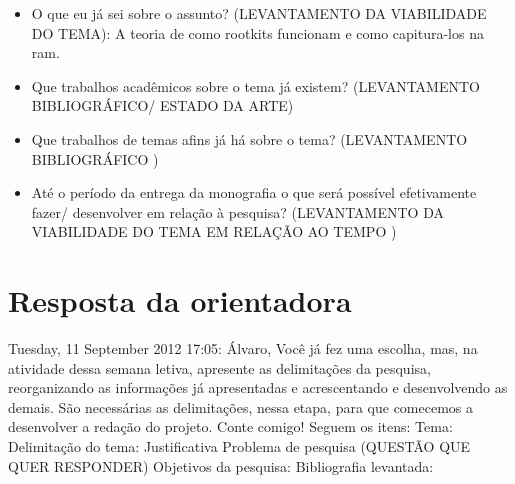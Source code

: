 \begin{itemize}
	\item O que eu já sei sobre o assunto? (LEVANTAMENTO DA VIABILIDADE DO TEMA): A teoria de como rootkits funcionam e como capitura-los na ram.


	\item Que trabalhos acadêmicos  sobre o tema já existem? (LEVANTAMENTO BIBLIOGRÁFICO/ ESTADO DA ARTE)

	\item Que trabalhos de temas afins já há sobre o tema? (LEVANTAMENTO BIBLIOGRÁFICO )

	\item Até o período da entrega da monografia o que será possível efetivamente fazer/ desenvolver em relação à pesquisa? (LEVANTAMENTO DA VIABILIDADE DO TEMA EM RELAÇÃO AO TEMPO )

\end{itemize}

\section{Resposta da orientadora}
Tuesday, 11 September 2012
17:05: Álvaro,
Você já fez uma escolha, mas, na atividade dessa semana letiva, apresente as delimitações da pesquisa, reorganizando as informações já apresentadas e acrescentando e desenvolvendo as demais. São necessárias as delimitações, nessa etapa, para que comecemos a desenvolver a redação do projeto. Conte comigo! Seguem os itens:
Tema:
Delimitação do tema:
Justificativa
Problema de pesquisa (QUESTÃO QUE QUER RESPONDER)
Objetivos da pesquisa:
Bibliografia levantada:
